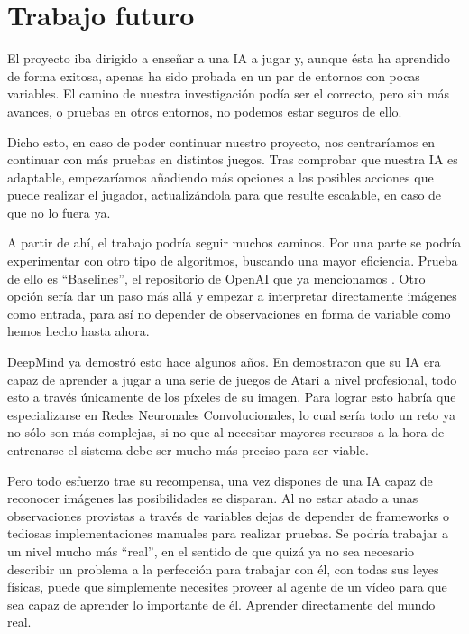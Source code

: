 \section{Trabajo futuro}

El proyecto iba dirigido a enseñar a una IA a jugar y, aunque ésta ha aprendido de forma exitosa, apenas ha sido probada en un par de entornos con pocas variables. El camino de nuestra investigación podía ser el correcto, pero sin más avances, o pruebas en otros entornos, no podemos estar seguros de ello. 

Dicho esto, en caso de poder continuar nuestro proyecto, nos centraríamos en continuar con más pruebas en distintos juegos. Tras comprobar que nuestra IA es adaptable, empezaríamos añadiendo más opciones a las posibles acciones que puede realizar el jugador, actualizándola para que resulte escalable, en caso de que no lo fuera ya. 

A partir de ahí, el trabajo podría seguir muchos caminos. Por una parte se podría experimentar con otro tipo de algoritmos, buscando una mayor eficiencia. Prueba de ello es ``Baselines'', el repositorio de OpenAI que ya mencionamos \citep{baselines}. Otro opción sería dar un paso más allá y empezar a interpretar directamente imágenes como entrada, para así no depender de observaciones en forma de variable como hemos hecho hasta ahora.

DeepMind ya demostró esto hace algunos años. En \citet{mnih2013playing} demostraron que su IA era capaz de aprender a jugar a una serie de juegos de Atari a nivel profesional, todo esto a través únicamente de los píxeles de su imagen. Para lograr esto habría que especializarse en Redes Neuronales Convolucionales, lo cual sería todo un reto ya no sólo son más complejas, si no que al necesitar mayores recursos a la hora de entrenarse el sistema debe ser mucho más preciso para ser viable.

Pero todo esfuerzo trae su recompensa, una vez dispones de una IA capaz de reconocer imágenes las posibilidades se disparan. Al no estar atado a unas observaciones provistas a través de variables dejas de depender de frameworks o tediosas implementaciones manuales para realizar pruebas. Se podría trabajar a un nivel mucho más ``real'', en el sentido de que quizá ya no sea necesario describir un problema a la perfección para trabajar con él, con todas sus leyes físicas, puede que simplemente necesites proveer al agente de un vídeo para que sea capaz de aprender lo importante de él. Aprender directamente del mundo real.
